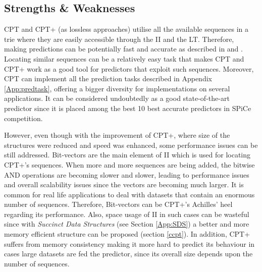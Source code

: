 \subsection{Strengths \& Weaknesses}\label{strength-weaknesses}

CPT and CPT+ (as lossless approaches) utilise all the available sequences in a trie where they are easily accessible through the II and the LT. Therefore, making predictions can be potentially fast and accurate as described in \citep{gueniche_fournier-viger_tseng_2013} and \citep{gueniche_fournier-viger_raman_tseng_2015}. Locating similar sequences can be a relatively easy task that makes CPT and CPT+ work as a good tool for predictors that exploit such sequences. Moreover, CPT can implement all the prediction tasks described in Appendix \ref{App:predtask}, offering a bigger diversity for implementations on several applications. It can be considered undoubtedly as a good state-of-the-art predictor since it is placed among the best 10 best accurate predictors in SPiCe \cite{balle:hal-01399429} competition.
\par {} 
\par However, even though with the improvement of CPT+, where size of the structures were reduced and speed was enhanced, some performance issues can be still addressed. Bit-vectors are the main element of II which is used for locating CPT+'s sequences. When more and more sequences are being added, the bitwise AND operations are becoming slower and slower, leading to performance issues and overall scalability issues since the vectors are becoming much larger. It is common for real life applications to deal with datasets that contain an enormous number of sequences. Therefore, Bit-vectors can be CPT+'s Achilles' heel regarding its performance. Also, space usage of II in such cases can be wasteful since with \emph{Succinct Data Structures} (see Section \ref{App:SDS}) a better and more memory efficient structure can be proposed (section \ref{ccpt}). In addition,  CPT+ suffers from memory consistency making it more hard to predict its behaviour in cases large datasets are fed the predictor, since its overall size depends upon the number of sequences. 
